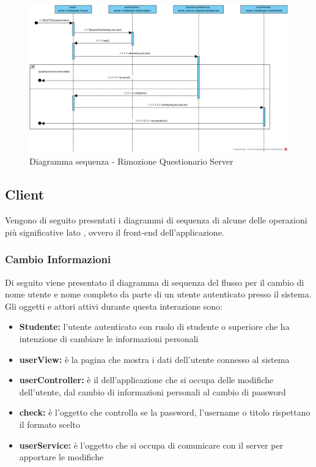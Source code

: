 \documentclass[12pt,a4paper]{article}
\begin{document}
\begin{center}
	\begin{figure}[H]
		\centering \includegraphics[max width=\myheight, angle=90]{../img/diagrammiSequenza/rimozioneQuestionarioServer.png}
		\caption{Diagramma sequenza - Rimozione Questionario Server}
	\end{figure}
\end{center}

\subsection{Client}

Vengono di seguito presentati i diagrammi di sequenza di alcune delle operazioni più significative lato , ovvero il front-end dell'applicazione.

\subsubsection{Cambio Informazioni}
Di seguito viene presentato il diagramma di sequenza del flusso per il cambio di nome utente e nome completo da parte di un utente autenticato presso il sistema. Gli oggetti e attori attivi durante questa interazione sono:

\begin{itemize}
	\item \textbf{Studente:} l'utente autenticato con ruolo di studente o superiore che ha intenzione di cambiare le informazioni personali
	\item \textbf{userView:} è la pagina che mostra i dati dell'utente connesso al sistema
	\item \textbf{userController:} è il  dell'applicazione che si occupa delle modifiche dell'utente, dal cambio di informazioni personali al cambio di password
	\item \textbf{check:} è l'oggetto che controlla se la password, l'username o titolo rispettano il formato scelto	
	\item \textbf{userService:} è l'oggetto che si occupa di comunicare con il server per apportare le modifiche
\end{itemize}
\end{document}
